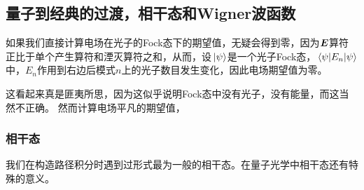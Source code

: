\subsection{量子到经典的过渡，相干态和Wigner波函数}

如果我们直接计算电场在光子的Fock态下的期望值，无疑会得到零，因为$\vb*{E}$算符正比于单个产生算符和湮灭算符之和，从而，设$\ket*{\psi}$是一个光子Fock态，$\mel{\psi}{E_n}{\psi}$中，$E_n$作用到右边后模式$n$上的光子数目发生变化，因此电场期望值为零。

这看起来真是匪夷所思，因为这似乎说明Fock态中没有光子，没有能量，而这当然不正确。
然而计算电场平凡的期望值，

\subsubsection{相干态}

我们在构造路径积分时遇到过形式最为一般的相干态。在量子光学中相干态还有特殊的意义。

